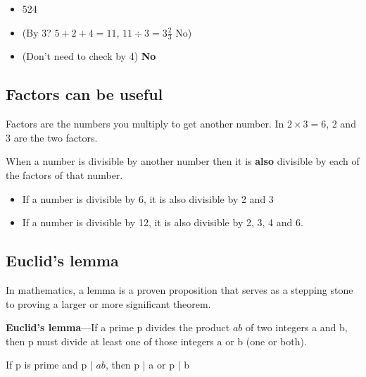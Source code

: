 \begin{itemize}
  \item 524
  \item (By 3? $5+2+4=11$, $11\div 3=3\frac{2}{3}$ No)
  \item (Don't need to check by 4) \textbf{No}
\end{itemize}

\subsection{Factors can be useful}

Factors are the numbers you multiply to get another number. In $2 \times 3=6$, 2 and 3 are the two factors.

When a number is divisible by another number then it is \textbf{also} divisible by each of the factors of that number.

\begin{itemize}
  \item If a number is divisible by 6, it is also divisible by 2 and 3
  \item If a number is divisible by 12, it is also divisible by 2, 3, 4 and 6.
\end{itemize}

\subsection{Euclid's lemma}

In mathematics, a lemma is a proven proposition that serves as a stepping stone to proving a larger or more significant theorem.

\textbf{Euclid's lemma}—If a prime p divides the product $ab$ of two integers a and b, then p must divide at least one of those integers a or b (one or both).

If p is prime and p | $ab$, then p | a or p | b
